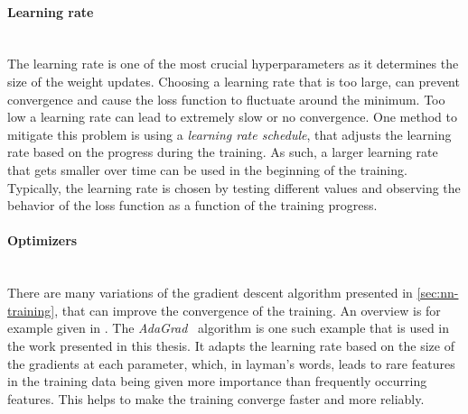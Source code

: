 \paragraph{Learning rate} \mbox{}\\
The learning rate is one of the most crucial hyperparameters as it determines the size of the weight updates. Choosing a learning rate that is too large, can prevent convergence and cause the loss function to fluctuate around the minimum. Too low a learning rate can lead to extremely slow or no convergence. 
One method to mitigate this problem is using a \emph{learning rate schedule}, that adjusts the learning rate based on the progress during the training. As such, a larger learning rate that gets smaller over time can be used in the beginning of the training. 
Typically, the learning rate is chosen by testing different values and observing the behavior of the loss function as a function of the training progress.


\paragraph{Optimizers}\mbox{}\\
There are many variations of the gradient descent algorithm presented in \cref{sec:nn-training}, that can improve the convergence of the training. An overview is for example given in . The \emph{AdaGrad}~ algorithm is one such example that is used in the work presented in this thesis. It adapts the learning rate based on the size of the gradients at each parameter, which, in layman's words, leads to rare features in the training data being given more importance than frequently occurring features. This helps to make the training converge faster and more reliably.

